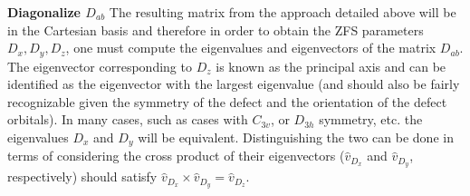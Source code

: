 \textbf{Diagonalize $D_{ab}$} The resulting matrix from the approach detailed above will be in the Cartesian basis and therefore in order to obtain the ZFS parameters $D_x, D_y, D_z $, one must compute the eigenvalues and eigenvectors of the matrix $D_{ab}$. The eigenvector corresponding to $D_z$ is known as the principal axis and can be identified as the eigenvector with the largest eigenvalue (and should also be fairly recognizable given the symmetry of the defect and the orientation of the defect orbitals). In many cases, such as cases with $C_{3v}$, or $D_{3h}$ symmetry, etc. the eigenvalues $D_x$ and $D_y$ will be equivalent. Distinguishing the two can be done in terms of considering the cross product of their eigenvectors ($\hat{v}_{D_x}$ and $\hat{v}_{D_y}$, respectively) should satisfy $\hat{v}_{D_x}\times\hat{v}_{D_y}=\hat{v}_{D_z}$.
\medskip


%

